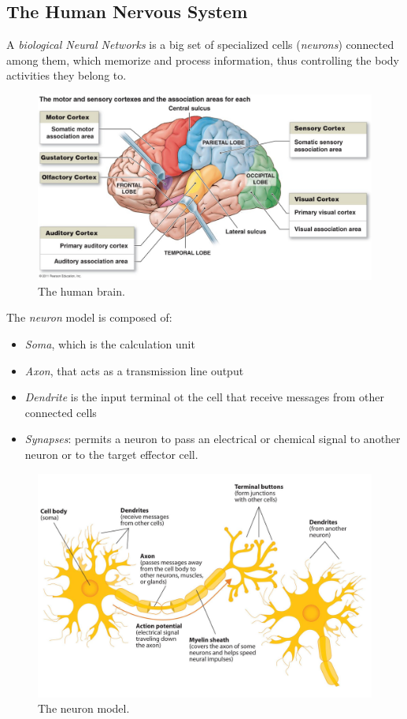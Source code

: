 \subsection{The Human Nervous System} 
A \textit{biological Neural Networks} is a big set of specialized cells (\textit{neurons}) connected among them, which memorize and process information, thus controlling the body activities they belong to.

\begin{figure}[t]

	\centering
	\includegraphics[width=0.65\linewidth]{img/Brain}
	\caption{The human brain.}
	\label{fig:brain}

\end{figure}

The \textit{neuron} model is composed of:
\begin{itemize}
	\item \textit{Soma}, which is the calculation unit
	\item \textit{Axon}, that acts as a transmission line output
	\item \textit{Dendrite} is the input terminal ot the cell that receive messages from other connected cells
	\item \textit{Synapses}: permits a neuron to pass an electrical or chemical signal to another neuron or to the target effector cell.
\end{itemize}


\begin{figure}[t]
	\centering
	\includegraphics[width=\linewidth]{img/neuron_model}
	\caption{The neuron model.}
\end{figure}

